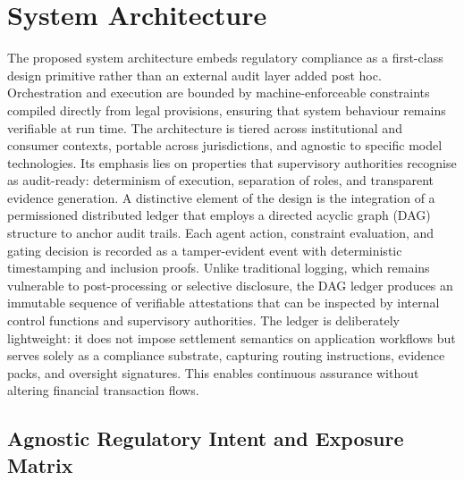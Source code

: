 \documentclass[oneside,10pt]{swissi}
\begin{document}
\section{System Architecture}

The proposed system architecture embeds regulatory compliance as a first-class design primitive rather than an external audit layer added post hoc. Orchestration and execution are bounded by machine-enforceable constraints compiled directly from legal provisions, ensuring that system behaviour remains verifiable at run time. The architecture is tiered across institutional and consumer contexts, portable across jurisdictions, and agnostic to specific model technologies. Its emphasis lies on properties that supervisory authorities recognise as audit-ready: determinism of execution, separation of roles, and transparent evidence generation. A distinctive element of the design is the integration of a permissioned distributed ledger that employs a directed acyclic graph (DAG) structure to anchor audit trails. Each agent action, constraint evaluation, and gating decision is recorded as a tamper-evident event with deterministic timestamping and inclusion proofs. Unlike traditional logging, which remains vulnerable to post-processing or selective disclosure, the DAG ledger produces an immutable sequence of verifiable attestations that can be inspected by internal control functions and supervisory authorities. The ledger is deliberately lightweight: it does not impose settlement semantics on application workflows but serves solely as a compliance substrate, capturing routing instructions, evidence packs, and oversight signatures. This enables continuous assurance without altering financial transaction flows.

\subsection{Agnostic Regulatory Intent and Exposure Matrix}
\end{document}
